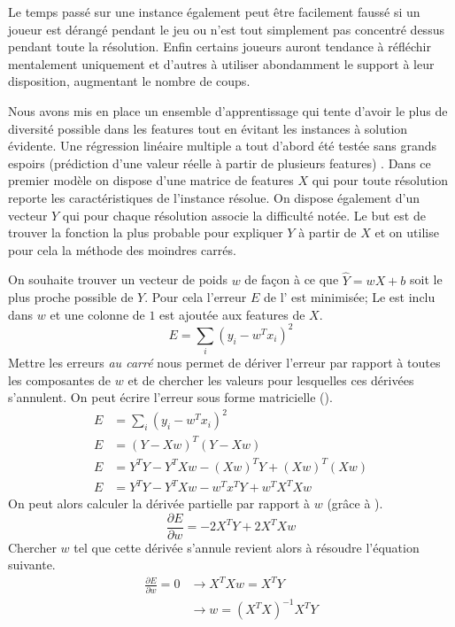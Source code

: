 \documentclass[../main.tex]{subfiles}
\begin{document}
	Le temps passé sur une instance également peut être facilement faussé si un joueur est dérangé pendant le jeu ou n'est tout simplement pas concentré dessus pendant toute la résolution. Enfin certains joueurs auront tendance à réfléchir mentalement uniquement et d'autres à utiliser abondamment le support à leur disposition, augmentant le nombre de coups. 
	
	Nous avons mis en place un ensemble d'apprentissage qui tente d'avoir le plus de diversité possible dans les features tout en évitant les instances à solution évidente. Une régression linéaire multiple a tout d'abord été testée sans grands espoirs (prédiction d'une valeur réelle à partir de plusieurs features) \cite{lr}. Dans ce premier modèle on dispose d'une matrice de features $X$ qui pour toute résolution reporte les caractéristiques de l'instance résolue. On dispose également d'un vecteur $Y$ qui pour chaque résolution associe la difficulté notée. Le but est de trouver la fonction la plus probable pour expliquer $Y$ à partir de $X$ et on utilise pour cela la méthode des moindres carrés. 
	
	On souhaite trouver un vecteur de poids $w$ de façon à ce que $\hat{Y} = wX + b$ soit le plus proche possible de $Y$. Pour cela l'erreur $E$ de l' est minimisée; Le  est inclu dans $w$ et une colonne de $1$ est ajoutée aux features de $X$.
\begin{equation}
\label{eq-error}
E = \sum_i (y_i - w^Tx_i)^2
\end{equation}
Mettre les erreurs \textit{au carré} nous permet de dériver l'erreur par rapport à toutes les composantes de $w$ et de chercher les valeurs pour lesquelles ces dérivées s'annulent. On peut écrire l'erreur sous forme matricielle ().
\begin{align}
E &= \sum_i (y_i - w^Tx_i)^2 \nonumber\\
E &= (Y - Xw)^T(Y - Xw) \nonumber\\
E &= Y^TY - Y^TXw - (Xw)^TY + (Xw)^T(Xw) \nonumber\\
E &= Y^TY - Y^TXw - w^Tx^TY + w^TX^TXw \label{eq-mat}
\end{align}
On peut alors calculer la dérivée partielle par rapport à $w$ (grâce à \cite{petersen}).
\begin{equation*}
\frac{\partial{E}}{\partial{w}} = -2X^TY + 2X^TXw
\end{equation*}
Chercher $w$ tel que cette dérivée s'annule revient alors à résoudre l'équation suivante.
\begin{align*}
\frac{\partial{E}}{\partial{w}} = 0 &\rightarrow X^TXw = X^TY \\
&\rightarrow w = (X^TX)^{-1}X^TY
\end{align*}
\end{document}
